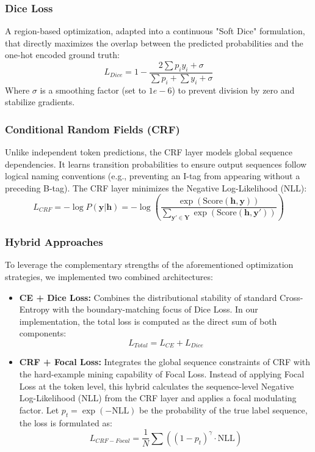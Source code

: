 \subsubsection{Dice Loss}
A region-based optimization, adapted into a continuous "Soft Dice" formulation, that directly maximizes the overlap between the predicted probabilities and the one-hot encoded ground truth:
\begin{equation}
	L_{Dice} = 1 - \frac{2 \sum p_i y_i + \sigma}{\sum p_i + \sum y_i + \sigma}
\end{equation}
Where $\sigma$ is a smoothing factor (set to $1e-6$) to prevent division by zero and stabilize gradients.

\subsubsection{Conditional Random Fields (CRF)}
Unlike independent token predictions, the CRF layer models global sequence dependencies. It learns transition probabilities to ensure output sequences follow logical naming conventions (e.g., preventing an I-tag from appearing without a preceding B-tag). The CRF layer minimizes the Negative Log-Likelihood (NLL):
\begin{equation}
	L_{CRF} = -\log P(\mathbf{y}|\mathbf{h}) = -\log \left( \frac{\exp(\text{Score}(\mathbf{h}, \mathbf{y}))}{\sum_{\mathbf{y'} \in \mathbf{Y}} \exp(\text{Score}(\mathbf{h}, \mathbf{y'}))} \right)
\end{equation}

\subsubsection{Hybrid Approaches}
To leverage the complementary strengths of the aforementioned optimization strategies, we implemented two combined architectures:
\begin{itemize}
    \item \textbf{CE + Dice Loss:} Combines the distributional stability of standard Cross-Entropy with the boundary-matching focus of Dice Loss. In our implementation, the total loss is computed as the direct sum of both components:
    $$L_{Total} = L_{CE} + L_{Dice}$$
    
    \item \textbf{CRF + Focal Loss:} Integrates the global sequence constraints of CRF with the hard-example mining capability of Focal Loss. Instead of applying Focal Loss at the token level, this hybrid calculates the sequence-level Negative Log-Likelihood (NLL) from the CRF layer and applies a focal modulating factor. Let $p_t = \exp(-\text{NLL})$ be the probability of the true label sequence, the loss is formulated as:
    $$L_{CRF-Focal} = \frac{1}{N} \sum \left( (1 - p_t)^\gamma \cdot \text{NLL} \right)$$
\end{itemize}
